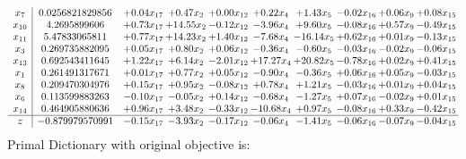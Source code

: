 \documentclass[9pt]{article}
\begin{document}
\[\begin{array}{c| c c@{\hskip 2pt} c@{\hskip 2pt} c@{\hskip 2pt} c@{\hskip 2pt} c@{\hskip 2pt} c@{\hskip 2pt} c@{\hskip 2pt} c@{\hskip 2pt} }
 x_{7}   &  0.0256821829856 & +  0.04 x_{17} & +  0.47 x_{2} & +  0.00 x_{12} & +  0.22 x_{4} & +  1.43 x_{5} & -0.02 x_{16} & +  0.06 x_{9} & +  0.08 x_{15}\\
 x_{10}   &  4.2695899606 & +  0.73 x_{17} & + 14.55 x_{2} & -0.12 x_{12} & -3.96 x_{4} & +  9.60 x_{5} & -0.08 x_{16} & +  0.57 x_{9} & -0.49 x_{15}\\
 x_{11}   &  5.47833065811 & +  0.77 x_{17} & + 14.23 x_{2} & +  1.40 x_{12} & -7.68 x_{4} & -16.14 x_{5} & +  0.62 x_{16} & +  0.01 x_{9} & -0.13 x_{15}\\
 x_{3}   &  0.269735882095 & +  0.05 x_{17} & +  0.80 x_{2} & +  0.06 x_{12} & -0.36 x_{4} & -0.60 x_{5} & -0.03 x_{16} & -0.02 x_{9} & -0.06 x_{15}\\
 x_{13}   &  0.692543411645 & +  1.22 x_{17} & +  6.14 x_{2} & -2.01 x_{12} & + 17.27 x_{4} & + 20.82 x_{5} & -0.78 x_{16} & +  0.02 x_{9} & +  0.41 x_{15}\\
 x_{1}   &  0.261491317671 & +  0.01 x_{17} & +  0.77 x_{2} & +  0.05 x_{12} & -0.90 x_{4} & -0.36 x_{5} & +  0.06 x_{16} & +  0.05 x_{9} & -0.03 x_{15}\\
 x_{8}   &  0.209470304976 & +  0.15 x_{17} & +  0.95 x_{2} & -0.08 x_{12} & +  0.78 x_{4} & +  1.21 x_{5} & -0.03 x_{16} & +  0.01 x_{9} & +  0.04 x_{15}\\
 x_{6}   &  0.113599883263 & -0.10 x_{17} & -0.05 x_{2} & +  0.14 x_{12} & -0.68 x_{4} & -1.27 x_{5} & +  0.07 x_{16} & -0.02 x_{9} & +  0.01 x_{15}\\
 x_{14}   &  0.464905880636 & +  0.96 x_{17} & +  3.48 x_{2} & -0.33 x_{12} & -10.68 x_{4} & +  0.97 x_{5} & -0.08 x_{16} & +  0.33 x_{9} & -0.42 x_{15}\\
\hline
z    &  -0.879979570991 & -0.15 x_{17} & -3.93 x_{2} & -0.17 x_{12} & -0.06 x_{4} & -1.41 x_{5} & -0.06 x_{16} & -0.07 x_{9} & -0.04 x_{15}\\
\end{array}\]
Primal Dictionary with original objective is:
\end{document}
